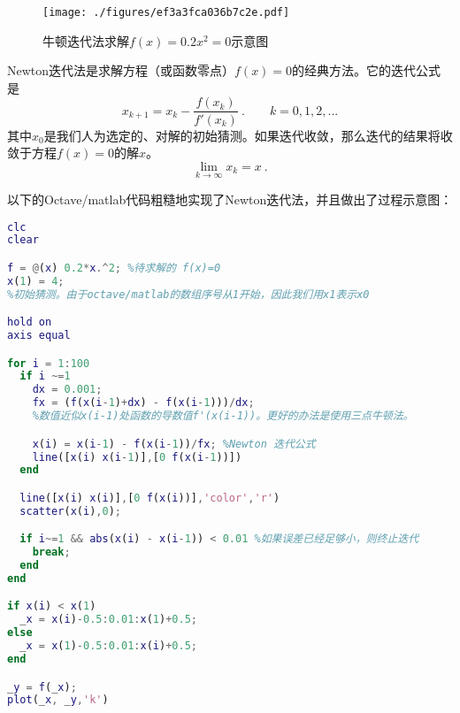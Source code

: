 

\begin{figure}[ht]
\centering
\texttt{[image: ./figures/ef3a3fca036b7c2e.pdf]}
\caption{牛顿迭代法求解$f(x)=0.2x^2=0$示意图} \label{fig_NWTNRT_1}
\end{figure}

Newton迭代法是求解方程（或函数零点）$f(x)=0$的经典方法。它的迭代公式是
\begin{equation}
x_{k+1} = x_k-\frac{f(x_k)}{f'(x_k)}~. \qquad k=0,1,2,...
\end{equation}
其中$x_0$是我们人为选定的、对解的初始猜测。如果迭代收敛，那么迭代的结果将收敛于方程$f(x)=0$的解$x$。
$$\lim_{k\to\infty} x_k = x~.$$

以下的Octave/matlab代码粗糙地实现了Newton迭代法，并且做出了过程示意图：
\begin{lstlisting}[language=matlab]
clc
clear

f = @(x) 0.2*x.^2; %待求解的 f(x)=0
x(1) = 4;  
%初始猜测。由于octave/matlab的数组序号从1开始，因此我们用x1表示x0

hold on
axis equal

for i = 1:100
  if i ~=1
    dx = 0.001;
    fx = (f(x(i-1)+dx) - f(x(i-1)))/dx; 
    %数值近似x(i-1)处函数的导数值f'(x(i-1))。更好的办法是使用三点牛顿法。

    x(i) = x(i-1) - f(x(i-1))/fx; %Newton 迭代公式
    line([x(i) x(i-1)],[0 f(x(i-1))])
  end

  line([x(i) x(i)],[0 f(x(i))],'color','r')
  scatter(x(i),0);

  if i~=1 && abs(x(i) - x(i-1)) < 0.01 %如果误差已经足够小，则终止迭代
    break;
  end
end

if x(i) < x(1)
  _x = x(i)-0.5:0.01:x(1)+0.5;
else
  _x = x(1)-0.5:0.01:x(i)+0.5;
end

_y = f(_x);
plot(_x, _y,'k')
\end{lstlisting}
